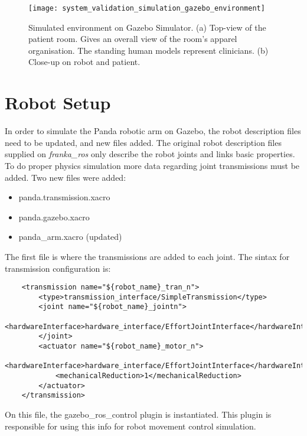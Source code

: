 \begin{figure}[htbp]
	\centering
	\texttt{[image: system\_validation\_simulation\_gazebo\_environment]}
	\caption[Simulated environment on Gazebo Simulator.]{Simulated environment on Gazebo Simulator. (a) Top-view of the patient room. Gives an overall view of the room's apparel organisation. The standing human models represent clinicians. (b) Close-up on robot and patient.}
	\label{fig:simulation_gazebo_environment}
\end{figure}


\section{Robot Setup}
\label{sec:gazebo_setup_robot}

In order to simulate the Panda robotic arm on Gazebo, the robot description files need to be updated, and new files added. The original robot description files supplied on \textit{franka\_ros} only describe the robot joints and links basic properties. To do proper physics simulation more data regarding joint transmissions must be added. Two new files were added:

\begin{itemize}
    \item panda.transmission.xacro
    \item panda.gazebo.xacro
    \item panda\_arm.xacro (updated)
\end{itemize}

The first file is where the transmissions are added to each joint. The sintax for transmission configuration is:

\begin{verbatim}
    <transmission name="${robot_name}_tran_n">
        <type>transmission_interface/SimpleTransmission</type>
        <joint name="${robot_name}_jointn">
            <hardwareInterface>hardware_interface/EffortJointInterface</hardwareInterface>
        </joint>
        <actuator name="${robot_name}_motor_n">
            <hardwareInterface>hardware_interface/EffortJointInterface</hardwareInterface>
            <mechanicalReduction>1</mechanicalReduction>
        </actuator>
    </transmission>
\end{verbatim}

On this file, the gazebo\_ros\_control plugin is instantiated. This plugin is responsible for using this info for robot movement control simulation.

